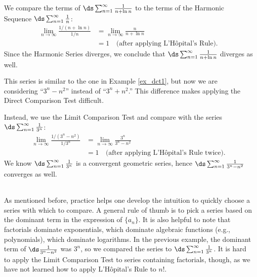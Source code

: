 {We compare the terms of $\ds\sum_{n=1}^\infty \frac1{n+\ln n}$ to the terms of the Harmonic Sequence $\ds\sum_{n=1}^\infty \frac1{n}$:
\begin{align*}
\lim_{n\to\infty}\frac{1/(n+\ln n)}{1/n} &= \lim_{n\to\infty} \frac{n}{n+\ln n} \\
			&= 1\quad \text{(after applying L'H\^opital's Rule)}.
\end{align*}
Since the Harmonic Series diverges, we conclude that $\ds\sum_{n=1}^\infty \frac1{n+\ln n}$ diverges as well.
}\\

{This series is similar to the one in Example \ref{ex_dct1}, but now we are considering ``$3^n-n^2$'' instead of ``$3^n+n^2$.'' This difference makes applying the Direct Comparison Test difficult.

Instead, we use the Limit Comparison Test and compare with the series $\ds\sum_{n=1}^\infty \frac1{3^n}$:
\begin{align*}
\lim_{n\to\infty}\frac{1/(3^n-n^2)}{1/3^n} &= \lim_{n\to\infty}\frac{3^n}{3^n-n^2} \\
		&= 1 \quad \text{(after applying L'H\^opital's Rule twice)}.
\end{align*}
We know $\ds\sum_{n=1}^\infty \frac1{3^n}$ is a convergent geometric series, hence $\ds\sum_{n=1}^\infty \frac1{3^n-n^2}$ converges as well.
}\\

As mentioned before, practice helps one develop the intuition to quickly choose a series with which to compare. A general rule of thumb is to pick a series based on the dominant term in the expression of $\{a_n\}$. It is also helpful to note that factorials dominate exponentials, which dominate algebraic functions (e.g., polynomials), which dominate logarithms. In the previous example, the dominant term of $\ds\frac{1}{3^n-n^2}$ was $3^n$, so we compared the series to $\ds \sum_{n=1}^\infty \frac1{3^n}$. It is hard to apply the Limit Comparison Test to series containing factorials, though, as we have not learned how to apply L'H\^opital's Rule to $n!$.\\

